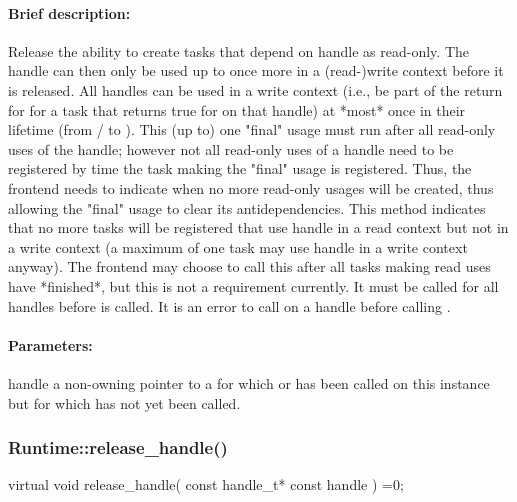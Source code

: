 \paragraph{Brief description:} Release the ability to create tasks that depend on handle as read-only.  The handle can
     then only be used up to once more in a (read-)write context before it is released.
     All handles can be used in a write context (i.e., be part of the return for 
       for a task that returns true for  on that handle) at *most* once in their lifetime
       (from / to ).  This (up to) one "final"
       usage must run after all read-only uses of the handle; however not all read-only uses of
       a handle need to be registered by time the task making the "final" usage is registered.  Thus,
       the frontend needs to indicate when no more read-only usages will be created, thus allowing
       the "final" usage to clear its antidependencies.
       This method indicates that no more tasks will be registered that use handle in a read context
       but not in a write context (a maximum of one task may use handle in a write context anyway).
       The frontend may choose to call this after all tasks making read uses have *finished*, but this
       is not a requirement currently.  It must be called for all handles before  is
       called.  It is an error to call  on a handle before calling .
     
\paragraph{Parameters:}
\begin{compactdesc} 
\item[handle] a non-owning pointer to a  for which  or
      has been called on this instance but for which  has not
       yet been called.
\end{compactdesc}


\subsubsection{Runtime::release\_handle()}
\begin{CppCode}
    virtual void
    release_handle(
      const handle_t* const handle
    ) =0;
\end{CppCode}

